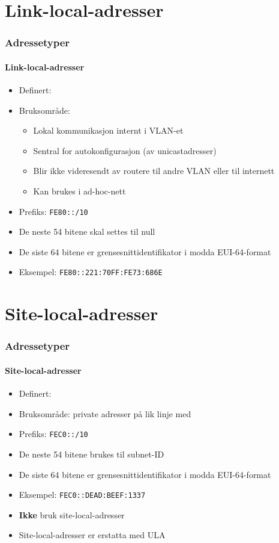 \section{Link-local-adresser}
\begin{frame}
  \frametitle{Adressetyper}
  \framesubtitle{Link-local-adresser}
  \begin{itemize}
  \item Definert: 
  \item Bruksområde:
    \begin{itemize}
    \item Lokal kommunikasjon internt i VLAN-et
    \item Sentral for autokonfigurasjon (av unicastadresser)
    \item Blir ikke videresendt av routere til andre VLAN eller til internett
    \item Kan brukes i ad-hoc-nett
    \end{itemize}
  \item Prefiks: \texttt{FE80::/10}
  \item De neste 54 bitene skal settes til null
  \item De siste 64 bitene er grensesnittidentifikator i modda
    EUI-64-format
  \item Eksempel: \texttt{FE80::221:70FF:FE73:686E}
  \end{itemize}
\end{frame}

\section{Site-local-adresser}
\begin{frame}
  \frametitle{Adressetyper}
  \framesubtitle{Site-local-adresser}
  \begin{itemize}
  \item Definert: 
  \item Bruksområde: private adresser på lik linje med 
  \item Prefiks: \texttt{FEC0::/10}
  \item De neste 54 bitene brukes til subnet-ID
  \item De siste 64 bitene er grensesnittidentifikator i modda
    EUI-64-format
  \item Eksempel: \texttt{FEC0::DEAD:BEEF:1337}
  \item \textbf{Ikke} bruk site-local-adresser 
  \item Site-local-adresser er erstatta med ULA 
  \end{itemize}
\end{frame}

